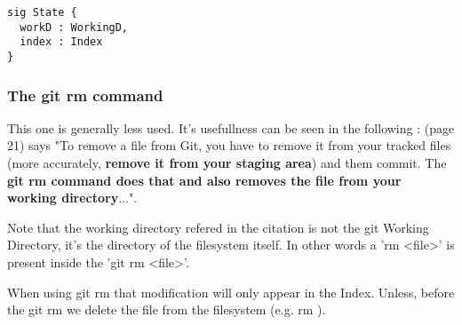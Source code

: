 \begin{lstlisting}
sig State {
  workD : WorkingD,
  index : Index
}
\end{lstlisting}

\subsubsection{The git rm command}

This one is generally less used. It's usefullness can be
seen in the following : \cite{progit}
(page 21) says "To remove a file from Git, you have to remove it
from your tracked files (more accurately, {\bf remove it from your
staging area}) and them commit. The {\bf git rm command does that
and also removes the file from your working directory}...". \par
Note that the working directory refered in the citation is not
the git Working Directory, it's the directory of the filesystem itself.
In other words a 'rm <file>' is present inside the 'git rm <file>'. \par
When using git rm
that modification will only appear in the Index. Unless, before
the git rm we delete the file from the filesystem (e.g. rm ). \par


